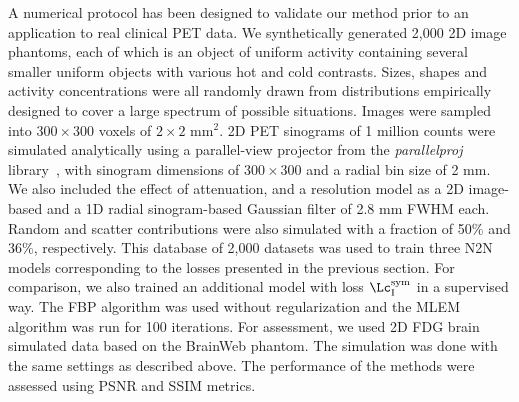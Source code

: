 \documentclass{IEEEtran}
\def\sym{^\text{sym}}
\def\ImDom{_\text{I}}
\newcommand{\JI}[1]{{\color{darkgreen}{#1}}\xspace}
\begin{document}

A numerical protocol has been designed to validate our method prior to an application to real clinical PET data.
We synthetically generated 2,000 2D image phantoms, each of which is an object of uniform activity containing several smaller uniform objects with various hot and cold contrasts.
Sizes, shapes and activity concentrations were all randomly drawn from distributions empirically designed to cover a large spectrum of possible situations.
Images were sampled into $300 \times 300$ voxels of $2 \times 2$ mm$^2$.
2D PET sinograms of 1 million counts were simulated analytically using a parallel-view projector from the \textit{parallelproj} library~\cite{10.3389/fnume.2023.1324562}, with sinogram dimensions of $300 \times 300$ and a radial bin size of 2 mm.
We also included the effect of attenuation, and a resolution model as a 2D image-based and a 1D radial sinogram-based Gaussian filter of 2.8 mm FWHM each.
Random and scatter contributions were also simulated with a fraction of 50\% and 36\%, respectively.
This database of 2,000 datasets was used to train three N2N models corresponding to the losses presented in the previous section.
For comparison, we also trained an additional model with loss $\Lc\sym\ImDom$ in a supervised way.
The FBP algorithm was used without regularization and the MLEM algorithm was run for 100 iterations.
For assessment, we used 2D FDG brain simulated data based on the BrainWeb phantom.
The simulation was done with the same settings as described above.
The performance of the methods were assessed using PSNR and SSIM metrics.
\end{document}

